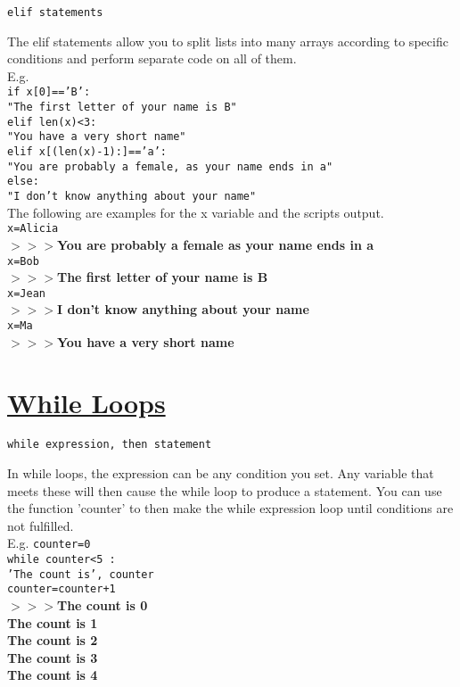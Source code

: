 \newpage

\noindent \texttt{elif statements}
\begin{myindentpar}{1.4cm}
\vspace*{-1ex}
The elif statements allow you to split lists into many arrays according to specific conditions and perform separate code on all of them.\\
E.g.\\
\texttt{{\color{orange}if} x[0]=='B':\\
 "The first letter of your name is B"\\
{\color{orange}elif} len(x)<3:\\
 "You have a very short name"\\
{\color{orange}elif} x[(len(x)-1):]=='a':\\
 "You are probably a female, as your name ends in a"\\
{\color{orange}else}:\\
 "I don't know anything about your name"}\\
The following are examples for the x variable and the scripts output.\\
\texttt{x=Alicia}\\
\textbf{$>>>$You are probably a female as your name ends in a}\\
\texttt{x=Bob}\\
\textbf{$>>>$The first letter of your name is B}\\
\texttt{x=Jean}\\
\textbf{$>>>$I don't know anything about your name}\\
\texttt{x=Ma}\\
\textbf{$>>>$You have a very short name}
\end{myindentpar}

\section*{\underline{While Loops}}
\noindent \texttt{while expression, then statement}
\begin{myindentpar}{1.4cm}
\vspace*{-1ex}
In while loops, the expression can be any condition you set. Any variable that meets these will then cause the while loop to produce a statement. You can use the function 'counter' to then make the while expression loop until conditions are not fulfilled.\\
E.g. \texttt{counter=0\\
{\color{orange}while} counter<5 :\\
 'The count is', counter\\
\phantom{tab}counter=counter+1 }\\
\textbf{$>>>$The count is 0\\
\phantom{$>>>$}The count is 1\\
\phantom{$>>>$}The count is 2\\
\phantom{$>>>$}The count is 3\\
\phantom{$>>>$}The count is 4}
\end{myindentpar}

